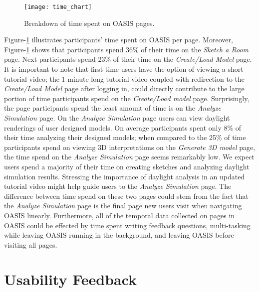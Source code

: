 \begin{figure}[!ht]
	\centering
	\caption{Breakdown of time spent on OASIS pages.}
	\label{fig:time_chart}
	\texttt{[image: time\_chart]}
\end{figure}

Figure-\ref{fig:time_chart} illustrates participants' time spent on OASIS per page.
Moreover, Figure-\ref{fig:time_chart} shows that participants spend 36\% of their time on the \textit{ Sketch a Room} page.
Next participants spend 23\% of their time on the \textit{Create/Load Model} page.
It is important to note that first-time users have the option of viewing a short tutorial video; 
the 1 minute long tutorial video coupled with redirection to the \textit{Create/Load Model} page after logging in, could directly contribute to the large portion of time participants spend on the \textit{Create/Load model} page.
Surprisingly, the page participants spend the least amount of time is on the \textit{Analyze Simulation} page. 
On the \textit{Analyze Simulation} page users can view daylight renderings of user designed models.
On average participants spent only 8\% of their time analyzing their designed models;
when compared to the 25\% of time participants spend on viewing 3D interpretations on the \textit{Generate 3D model} page, the time spend on the \textit{Analyze Simulation} page seems remarkably low.
We expect users spend a majority of their time on creating sketches and analyzing daylight simulation results.
Stressing the importance of daylight analysis in an updated tutorial video might help guide users to the \textit{Analyze Simulation} page.
The difference between time spend on these two pages could stem from the fact that the \textit{Analyze Simulation} page is the final page new users visit when navigating OASIS linearly.
Furthermore, all of the temporal data collected on pages in OASIS could be effected by time spent writing feedback questions, multi-tasking while leaving OASIS running in the background, and leaving OASIS before visiting all pages.
 
\section{Usability Feedback}

